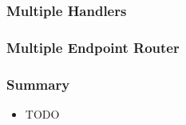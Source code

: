 \begin{frame}
  \frametitle{Multiple Handlers}
  
\end{frame}

\begin{frame}
  \frametitle{Multiple Endpoint Router}
  
\end{frame}

\begin{frame}
\end{frame}


\begin{frame}
\end{frame}

\begin{frame}
  \frametitle{Summary}
  \begin{itemize}
    \item TODO
  \end{itemize}
\end{frame}

\begin{frame}
\end{frame}

\begin{frame}
  \titlepage
\end{frame}
